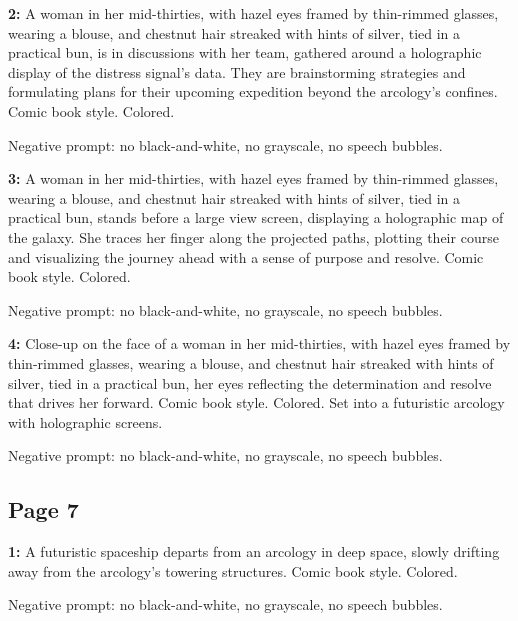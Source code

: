 \begin{iquote}
    \textbf{2:} A woman in her mid-thirties, with hazel eyes framed by thin-rimmed glasses, wearing a blouse, and chestnut hair streaked with hints of silver, tied in a practical bun, is in discussions with her team, gathered around a holographic display of the distress signal's data. They are brainstorming strategies and formulating plans for their upcoming expedition beyond the arcology's confines. Comic book style. Colored.

    \noindent Negative prompt: no black-and-white, no grayscale, no speech bubbles.
\end{iquote}

\begin{iquote}
    \textbf{3:} A woman in her mid-thirties, with hazel eyes framed by thin-rimmed glasses, wearing a blouse, and chestnut hair streaked with hints of silver, tied in a practical bun, stands before a large view screen, displaying a holographic map of the galaxy. She traces her finger along the projected paths, plotting their course and visualizing the journey ahead with a sense of purpose and resolve. Comic book style. Colored.

    \noindent Negative prompt: no black-and-white, no grayscale, no speech bubbles.
\end{iquote}

\begin{iquote}
    \textbf{4:} Close-up on the face of a woman in her mid-thirties, with hazel eyes framed by thin-rimmed glasses, wearing a blouse, and chestnut hair streaked with hints of silver, tied in a practical bun, her eyes reflecting the determination and resolve that drives her forward. Comic book style. Colored. Set into a futuristic arcology with holographic screens.

    \noindent Negative prompt: no black-and-white, no grayscale, no speech bubbles.
\end{iquote}


\subsection*{Page 7}
\begin{iquote}
    \textbf{1:} A futuristic spaceship departs from an arcology in deep space, slowly drifting away from the arcology's towering structures. Comic book style. Colored.

    \noindent Negative prompt: no black-and-white, no grayscale, no speech bubbles.
\end{iquote}

